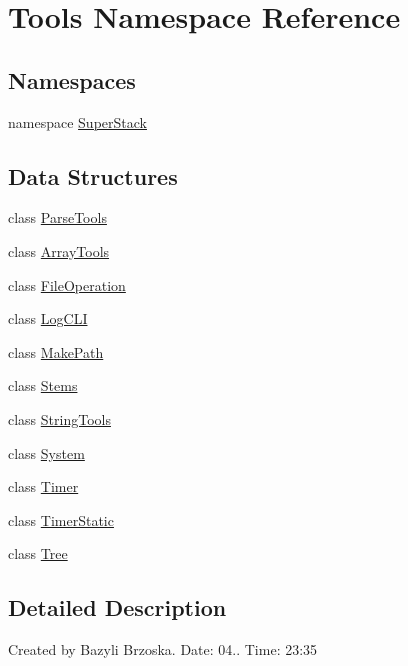 \hypertarget{namespace_tools}{
\section{\-Tools \-Namespace \-Reference}
\label{namespace_tools}
}
\subsection*{\-Namespaces}
\begin{DoxyCompactItemize}
\item 
namespace \hyperlink{namespace_tools_1_1_super_stack}{\-Super\-Stack}
\end{DoxyCompactItemize}
\subsection*{\-Data \-Structures}
\begin{DoxyCompactItemize}
\item 
class \hyperlink{class_tools_1_1_parse_tools}{\-Parse\-Tools}
\item 
class \hyperlink{class_tools_1_1_array_tools}{\-Array\-Tools}
\item 
class \hyperlink{class_tools_1_1_file_operation}{\-File\-Operation}
\item 
class \hyperlink{class_tools_1_1_log_c_l_i}{\-Log\-C\-L\-I}
\item 
class \hyperlink{class_tools_1_1_make_path}{\-Make\-Path}
\item 
class \hyperlink{class_tools_1_1_stems}{\-Stems}
\item 
class \hyperlink{class_tools_1_1_string_tools}{\-String\-Tools}
\item 
class \hyperlink{class_tools_1_1_system}{\-System}
\item 
class \hyperlink{class_tools_1_1_timer}{\-Timer}
\item 
class \hyperlink{class_tools_1_1_timer_static}{\-Timer\-Static}
\item 
class \hyperlink{class_tools_1_1_tree}{\-Tree}
\end{DoxyCompactItemize}


\subsection{\-Detailed \-Description}
\-Created by \-Bazyli \-Brzoska. \-Date\-: 04.. \-Time\-: 23\-:35 
